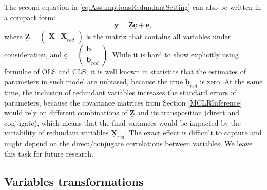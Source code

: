 \documentclass[
]{book}
\begin{document}
The second equation in \eqref{eq:AssumptionsRedundantSetting} can also be written in a compact form:
\begin{equation}
    \underline{\mathbf{y}} = \underline{\mathbf{Z}} \underline{\boldsymbol{c}}  + \underline{\boldsymbol{e}} ,
    \label{eq:AssumptionsRedundantAppliedModel}
\end{equation}
where \(\underline{\mathbf{Z}} = \begin{pmatrix} \underline{\mathbf{X}} & \underline{\mathbf{X}}_{red} \end{pmatrix}\) is the matrix that contains all variables under consideration, and \(\underline{\boldsymbol{c}} = \begin{pmatrix} \underline{\boldsymbol{b}} \\ \underline{\boldsymbol{b}}_{red} \end{pmatrix}\). While it is hard to show explicitly using formulae of OLS and CLS, it is well known in statistics that the estimates of parameters in such model are unbiased, because the true \(\underline{\boldsymbol{b}}_{red}\) is zero. At the same time, the inclusion of redundant variables increases the standard errors of parameters, because the covariance matrices from Section \ref{MCLRInference} would rely on different combinations of \(\underline{\mathbf{Z}}\) and its transposition (direct and conjugate), which means that the final variances would be impacted by the variability of redundant variables \(\underline{\mathbf{X}}_{red}\). The exact effect is difficult to capture and might depend on the direct/conjugate correlations between variables. We leave this task for future research.

\hypertarget{assumptionsSpecificationTransformation}{%
\subsection{Variables transformations}\label{assumptionsSpecificationTransformation}}
\end{document}
